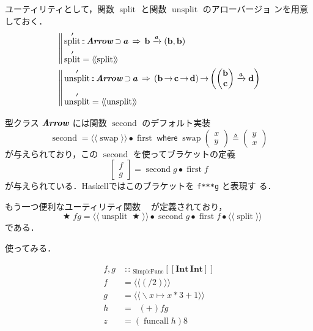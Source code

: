 \documentclass[a5paper,twoside,fleqn,draft]{jsbook}
\def\[{[\![}
\def\]{]\!]}
\def\llangle{\langle\!\langle}
\def\rrangle{\rangle\!\rangle}
\newcommand{\Langle}{\llangle}
\newcommand{\Rangle}{\rrangle}
\newcommand{\programminglanguage}[1]{\textsf{#1}}
\newcommand{\haskell}{\programminglanguage{Haskell}}
\newcommand{\code}[1]{\texttt{#1}}
\newcommand{\mBrace}{\Vert}
\newcommand{\mKeyword}[1]{\mathsf{#1}}
\newcommand{\mWhereKeyword}{\mKeyword{where}}
\DeclareMathOperator{\mSuperClass}{\;\Rightarrow\;}
\DeclareMathOperator{\mSuperSet}{\supset}
\DeclareMathOperator{\mWhere}{\mWhereKeyword}
\newcommand{\mSpecialFunc}[1]{\mathrm{#1}}
\DeclareMathOperator{\mFirst}{\mSpecialFunc{first}}
\DeclareMathOperator{\mFuncall}{\mSpecialFunc{funcall}}
\DeclareMathOperator{\mLiftATwo}{\mSpecialFunc{liftA}_2}
\DeclareMathOperator{\mSecond}{\mSpecialFunc{second}}
\DeclareMathOperator{\mSplit}{\mSpecialFunc{split}}
\DeclareMathOperator{\mSwap}{\mSpecialFunc{swap}}
\DeclareMathOperator{\mUnsplit}{\mSpecialFunc{unsplit}}
\newcommand{\mArrowArrow}[1]{\xrightarrow{#1}}
\DeclareMathOperator{\mBinOp}{\bigstar}
\DeclareMathOperator{\mCompCat}{\bullet}
\DeclareMathOperator{\mFuncArrow}{\rightarrow}
\DeclareMathOperator{\mIn}{{:\!:}}
\DeclareMathOperator{\mLambda}{\backslash}
\DeclareMathOperator{\mLambdaArrow}{\mapsto}
\DeclareMathOperator{\mLetEq}{\triangleq}
\newcommand{\mType}[1]{\mathbf{#1}} %
\newcommand{\mPolymorphicTypeParameter}[1]{\textbf{\textit{#1}}}
\newcommand{\mB}{\mType{b}}
\newcommand{\mC}{\mType{c}}
\newcommand{\mD}{\mType{d}}
\newcommand{\mIntType}{\mType{Int}}
\newcommand{\mValueConstructor}[1]{\mathrm{#1}}
\newcommand{\mValueWith}[2]{{}_\mValueConstructor{#1}\[#2\]}
\newcommand{\mArrowWith}[1]{\Langle#1\Rangle}
\newcommand{\mPairWith}[2]{\begin{pmatrix}#1\\#2\end{pmatrix}}
\newcommand{\mTypeClass}[1]{\textbf{\textit{#1}}}
\newcommand{\mArrowTypeClass}{\mTypeClass{Arrow}}
\begin{document}
ユーティリティとして，関数 $\mSplit$ と関数 $\mUnsplit$ のアローバージョ
ンを用意しておく．
\begin{align}
  &\left\mBrace
  \begin{aligned}
    &\mSplit'
    \mIn\mArrowTypeClass\mSuperSet\mPolymorphicTypeParameter{a}
    \mSuperClass\mB\mArrowArrow{\mPolymorphicTypeParameter{a}}(\mB,\mB)\\
    &\mSplit'
    =\mArrowWith{\mSplit}
  \end{aligned}
  \right.\\
  &\left\mBrace
  \begin{aligned}
    &\mUnsplit'
    \mIn\mArrowTypeClass\mSuperSet\mPolymorphicTypeParameter{a}
    \mSuperClass{}(\mB\mFuncArrow\mC\mFuncArrow\mD)
    \mFuncArrow\left(\mPairWith{\mB}{\mC}\mArrowArrow{\mPolymorphicTypeParameter{a}}\mD\right)\\
    &\mUnsplit'
    =\mArrowWith{\mUnsplit}
  \end{aligned}
  \right.
\end{align}

型クラス $\mArrowTypeClass$ には関数 $\mSecond$ のデフォルト実装
\begin{equation}
  \mSecond
  =\mArrowWith{\mSwap}\mCompCat\mFirst
  \mWhere\mSwap\mPairWith{x}{y}\mLetEq\mPairWith{y}{x}
\end{equation}
が与えられており，この $\mSecond$ を使ってブラケットの定義
\begin{equation}
  \begin{bmatrix}
    f\\
    g
  \end{bmatrix}
  =\mSecond g\mCompCat\mFirst f
\end{equation}
が与えられている．\haskell ではこのブラケットを \code{f***g} と表現す
る．

もう一つ便利なユーティリティ関数 $\mLiftATwo$ が定義されており，
\begin{equation}
  \mLiftATwo\mBinOp fg
  =\mArrowWith{\mUnsplit\mBinOp}\mCompCat\mSecond g\mCompCat\mFirst f\mCompCat{}\mArrowWith{\mSplit}
\end{equation}
である．

使ってみる．

\begin{align}
  f,g&\mIn\mValueWith{SimpleFunc}{\mIntType\,\mIntType}\\
  f&=\mArrowWith{(/2)}\\
  g&=\mArrowWith{\mLambda x\mLambdaArrow x*3+1}\\
  h&=\mLiftATwo(+)fg\\
  z&=(\mFuncall h)8
\end{align}
\end{document}
